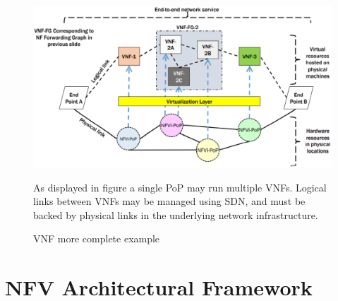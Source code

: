 \begin{figure}[htbp]
   \centering
   \includegraphics{images/vnf_fullarch.png}
   \caption{VNF more complete example}
   As displayed in figure a single PoP may run multiple VNFs.
   Logical links between VNFs may be managed using SDN, and must be backed by physical links in the underlying network infrastructure.
   \label{fig:vnf_fullarch}
\end{figure}

\section{NFV Architectural Framework}

